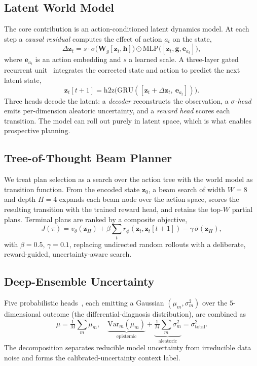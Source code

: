 \documentclass[11pt,a4paper]{report}
\newcommand{\zt}{\mathbf{z}_t}
\begin{document}
\subsection{Latent World Model}
The core contribution is an action-conditioned latent dynamics model. At each
step a \emph{causal residual} computes the effect of action $a_t$ on the state,
\begin{equation}
\Delta\zt = s\cdot \sigma\!\big(\mathbf{W}_g[\zt,\mathbf{h}]\big)\odot
\mathrm{MLP}\big([\zt,\mathbf{g},\mathbf{e}_{a_t}]\big),
\end{equation}
where $\mathbf{e}_{a_t}$ is an action embedding and $s$ a learned scale. A
three-layer gated recurrent unit~\cite{cho2014gru} integrates the corrected
state and action to predict the next latent state,
\begin{equation}
\zt[t+1] = \mathrm{h2z}\big(\mathrm{GRU}([\zt+\Delta\zt,\ \mathbf{e}_{a_t}])\big).
\end{equation}
Three heads decode the latent: a \emph{decoder} reconstructs the observation, a
\emph{$\sigma$-head} emits per-dimension aleatoric uncertainty, and a
\emph{reward head} scores each transition. The model can roll out purely in
latent space, which is what enables prospective planning.

\subsection{Tree-of-Thought Beam Planner}
We treat plan selection as a search over the action tree with the world model as
transition function. From the encoded state $\mathbf{z}_0$, a beam search of
width $W{=}8$ and depth $H{=}4$ expands each beam node over the action space,
scores the resulting transition with the trained reward head, and retains the
top-$W$ partial plans. Terminal plans are ranked by a composite objective,
\begin{equation}
J(\pi) = v_\theta(\mathbf{z}_H) + \beta\!\sum_{t}r_\phi(\zt,\zt[t+1])
- \gamma\,\bar{\sigma}(\mathbf{z}_H),
\end{equation}
with $\beta{=}0.5$, $\gamma{=}0.1$, replacing undirected random rollouts with a
deliberate, reward-guided, uncertainty-aware search.

\subsection{Deep-Ensemble Uncertainty}
Five probabilistic heads~\cite{lakshminarayanan2017ensembles}, each emitting a
Gaussian $(\mu_m,\sigma_m^2)$ over the $5$-dimensional outcome (the
differential-diagnosis distribution), are combined as
\begin{equation}
\mu=\tfrac{1}{M}\sum_m\mu_m,\quad
\underbrace{\mathrm{Var}_m(\mu_m)}_{\text{epistemic}}+
\underbrace{\tfrac{1}{M}\sum_m\sigma_m^2}_{\text{aleatoric}}=\sigma^2_{\text{total}} .
\end{equation}
The decomposition separates reducible model uncertainty from irreducible data
noise and forms the calibrated-uncertainty context label.
\end{document}

